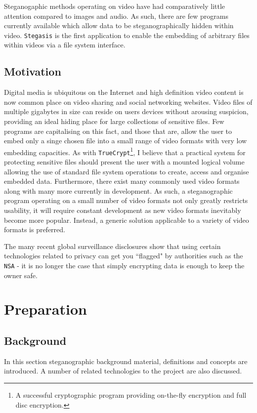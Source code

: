 \documentclass[paper=a4, fontsize=11pt,twoside]{scrartcl}    %
\numberwithin{table}{section}
\numberwithin{figure}{section}
\numberwithin{algorithm}{section}
\begin{document}
Steganogaphic methods operating on video have had comparatively little attention compared to images and audio. As such, there are few programs currently available which allow data to be steganographically hidden within video. \texttt{Stegasis} is the first application to enable the embedding of arbitrary files within videos via a file system interface.   



\subsection{Motivation}
Digital media is ubiquitous on the Internet and high definition video content is now common place on video sharing and social networking websites. Video files of multiple gigabytes in size can reside on users devices without arousing suspicion, providing an ideal hiding place for large collections of sensitive files. Few programs are capitalising on this fact, and those that are, allow the user to embed only a singe chosen file into a small range of video formats with very low embedding capacities. As with \texttt{TrueCrypt}\footnote{A successful cryptographic program providing on-the-fly encryption and full disc encryption.}, I believe that a practical system for protecting sensitive files should present the user with a mounted logical volume allowing the use of standard file system operations to create, access and organise embedded data. Furthermore, there exist many commonly used video formats along with many more currently in development. As such, a steganographic program operating on a small number of video formats not only greatly restricts usability, it will require constant development as new video formats inevitably become more popular. Instead, a generic solution applicable to a variety of video formats is preferred.

The many recent global surveillance disclosures show that using certain technologies related to privacy can get you ``flagged" by authorities such as the \texttt{NSA} - it is no longer the case that simply encrypting data is enough to keep the owner safe.

\section{Preparation}
\subsection{Background}
In this section steganographic background material, definitions and concepts are introduced. A number of related technologies to the project are also discussed.\\
\end{document}
